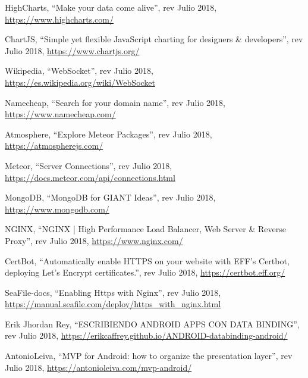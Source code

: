 \begin{thebibliography}{99}
 HighCharts, ``Make your data come alive'', rev Julio 2018, \hyperref[highcharts]{https://www.highcharts.com/}

 ChartJS, ``Simple yet flexible JavaScript charting for designers \& developers'', rev Julio 2018, \hyperref[chartjs]{https://www.chartjs.org/}

 Wikipedia, ``WebSocket'', rev Julio 2018, \hyperref[websocket]{https://es.wikipedia.org/wiki/WebSocket}

 Namecheap, ``Search for your domain name'', rev Julio 2018, \hyperref[namecheap]{https://www.namecheap.com/}

 Atmosphere, ``Explore Meteor Packages'', rev Julio 2018, \hyperref[atmosphere]{https://atmospherejs.com/}

 Meteor, ``Server Connections'', rev Julio 2018, \hyperref[ddp]{https://docs.meteor.com/api/connections.html}

 MongoDB, ``MongoDB for GIANT Ideas'', rev Julio 2018, \hyperref[mongodb]{https://www.mongodb.com/}

 NGINX, ``NGINX | High Performance Load Balancer, Web Server \& Reverse Proxy'', rev Julio 2018, \hyperref[nginx]{https://www.nginx.com/}

 CertBot, ``Automatically enable HTTPS on your website with EFF's Certbot, deploying Let's Encrypt certificates.'', rev Julio 2018, \hyperref[certbot]{https://certbot.eff.org/}

 SeaFile-docs, ``Enabling Https with Nginx'', rev Julio 2018, \hyperref[nginx_certbot]{https://manual.seafile.com/deploy/https\_with\_nginx.html}

 Erik Jhordan Rey, ``ESCRIBIENDO ANDROID APPS CON DATA BINDING'', rev Julio 2018, \hyperref[mvvm]{https://erikcaffrey.github.io/ANDROID-databinding-android/}

 AntonioLeiva, ``MVP for Android: how to organize the presentation layer'', rev Julio 2018, \hyperref[mvp]{https://antonioleiva.com/mvp-android/}

\end{thebibliography}
